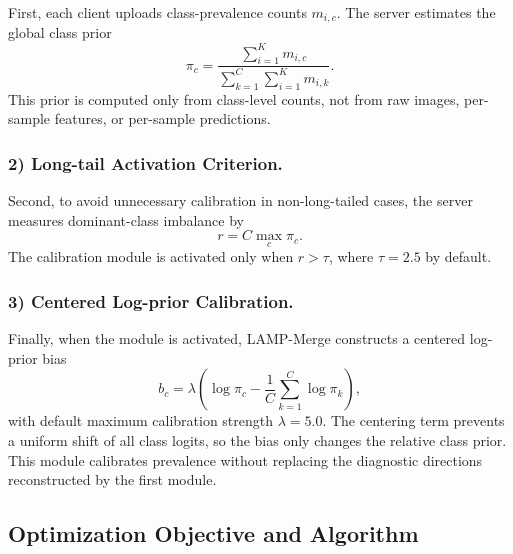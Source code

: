 \documentclass[letterpaper]{article} %
\begin{document}
First, each client uploads class-prevalence counts $m_{i,c}$. The server estimates the global class prior
\begin{equation}
\pi_c=\frac{\sum_{i=1}^{K}m_{i,c}}{\sum_{k=1}^{C}\sum_{i=1}^{K}m_{i,k}}.
\end{equation}
This prior is computed only from class-level counts, not from raw images, per-sample features, or per-sample predictions.

\subsubsection{2) Long-tail Activation Criterion.}

Second, to avoid unnecessary calibration in non-long-tailed cases, the server measures dominant-class imbalance by
\begin{equation}
r=C\max_c \pi_c.
\end{equation}
The calibration module is activated only when $r>\tau$, where $\tau=2.5$ by default.

\subsubsection{3) Centered Log-prior Calibration.}

Finally, when the module is activated, LAMP-Merge constructs a centered log-prior bias
\begin{equation}
b_c=\lambda\left(\log\pi_c-\frac{1}{C}\sum_{k=1}^{C}\log\pi_k\right),
\end{equation}
with default maximum calibration strength $\lambda=5.0$. The centering term prevents a uniform shift of all class logits, so the bias only changes the relative class prior. This module calibrates prevalence without replacing the diagnostic directions reconstructed by the first module.

\subsection{Optimization Objective and Algorithm}
\end{document}
